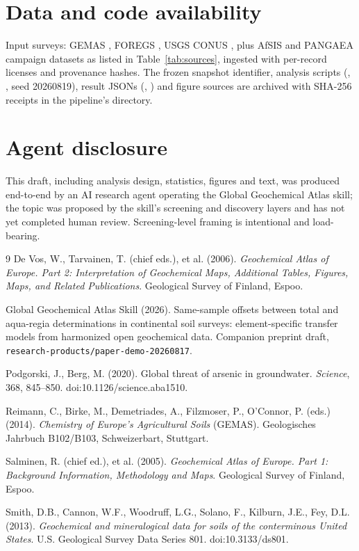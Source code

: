 \documentclass[11pt]{article}
\begin{document}
\section*{Data and code availability}
Input surveys: GEMAS \cite{reimann2014}, FOREGS
\cite{salminen2005,devos2006}, USGS CONUS \cite{smith2013}, plus AfSIS and
PANGAEA campaign datasets as listed in Table~\ref{tab:sources}, ingested
with per-record licenses and provenance hashes. The frozen snapshot
identifier, analysis scripts (,
, seed 20260819), result JSONs
(, )
and figure sources are archived with SHA-256 receipts in the pipeline's
 directory.

\section*{Agent disclosure}
This draft, including analysis design, statistics, figures and text, was
produced end-to-end by an AI research agent operating the Global
Geochemical Atlas skill; the topic was proposed by the skill's screening
and discovery layers and has not yet completed human review.
Screening-level framing is intentional and load-bearing.

\begin{thebibliography}{9}
De Vos, W., Tarvainen, T. (chief eds.), et al. (2006). \emph{Geochemical
Atlas of Europe. Part 2: Interpretation of Geochemical Maps, Additional
Tables, Figures, Maps, and Related Publications}. Geological Survey of
Finland, Espoo.

Global Geochemical Atlas Skill (2026). Same-sample offsets between total
and aqua-regia determinations in continental soil surveys: element-specific
transfer models from harmonized open geochemical data. Companion preprint
draft, \texttt{research-products/paper-demo-20260817}.

Podgorski, J., Berg, M. (2020). Global threat of arsenic in groundwater.
\emph{Science}, 368, 845--850. doi:10.1126/science.aba1510.

Reimann, C., Birke, M., Demetriades, A., Filzmoser, P., O'Connor, P. (eds.)
(2014). \emph{Chemistry of Europe's Agricultural Soils} (GEMAS).
Geologisches Jahrbuch B102/B103, Schweizerbart, Stuttgart.

Salminen, R. (chief ed.), et al. (2005). \emph{Geochemical Atlas of Europe.
Part 1: Background Information, Methodology and Maps}. Geological Survey of
Finland, Espoo.

Smith, D.B., Cannon, W.F., Woodruff, L.G., Solano, F., Kilburn, J.E., Fey,
D.L. (2013). \emph{Geochemical and mineralogical data for soils of the
conterminous United States}. U.S. Geological Survey Data Series 801.
doi:10.3133/ds801.
\end{thebibliography}
\end{document}

